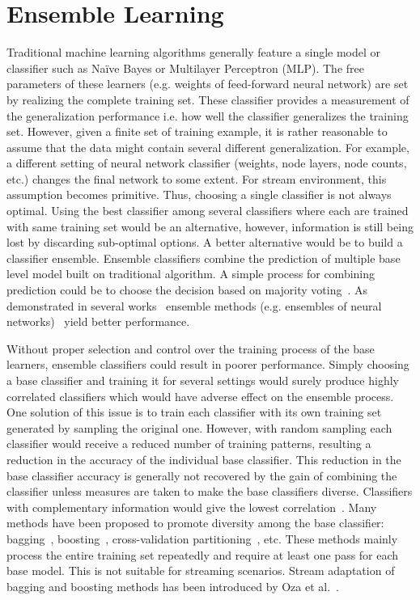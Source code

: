 \section{Ensemble Learning}
Traditional machine learning algorithms generally feature a single model or classifier such as Na\"ive Bayes or Multilayer Perceptron (MLP). The free parameters of these learners (e.g. weights of feed-forward neural network) are set by realizing the complete training set. These classifier provides a measurement of the generalization performance i.e. how well the classifier generalizes the training set. However, given a finite set of training example, it is rather reasonable to assume that the data might contain several different generalization. For example, a different setting of neural network classifier (weights, node layers, node counts, etc.) changes the final network to some extent. For stream environment, this assumption becomes primitive. Thus, choosing a single classifier is not always optimal. Using the best classifier among several classifiers where each are trained with same training set would be an alternative, however, information is still being lost by discarding sub-optimal options. A better alternative would be to build a classifier ensemble. Ensemble classifiers combine the prediction of multiple base level model built on traditional algorithm. A simple process for combining prediction could be to choose the decision based on majority voting~\cite{parhami94:voting}. As demonstrated in several works~\cite{breiman93:regression, schapire90:whyens, wolpert92:whyens} ensemble methods (e.g. ensembles of neural networks)~\cite{hansen90:ensNN, tumer99:whyens} yield better performance. 

Without proper selection and control over the training process of the base learners, ensemble classifiers could result in poorer performance. Simply choosing a base classifier and training it for several settings would surely produce highly correlated classifiers which would have adverse effect on the ensemble process. One solution of this issue is to train each classifier with its own training set generated by sampling the original one. However, with random sampling each classifier would receive a reduced number of training patterns, resulting a reduction in the accuracy of the individual base classifier. This reduction in the base classifier accuracy is generally not recovered by the gain of combining the classifier unless measures are taken to make the base classifiers diverse. Classifiers with complementary information would give the lowest correlation~\cite{breiman93:regression, tumer99:whyens}. Many methods have been proposed to promote diversity among the base classifier: bagging~\cite{breiman94:bagging}, boosting~\cite{drucker94:boosting, freund97:boosting, oza99:whyens}, cross-validation partitioning~\cite{krogh95:ensNNcv, tumer99:whyens}, etc. These methods mainly process the entire training set repeatedly and require at least one pass for each base model. This is not suitable for streaming scenarios. Stream adaptation of bagging and boosting methods has been introduced by Oza et al.~\cite{oza01:obagboost,oza01:thesis}.

